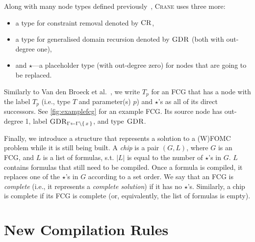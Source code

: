 \documentclass{article}
\theoremstyle{definition}
\DeclareMathOperator{\CR}{\textsc{CR}}
\DeclareMathOperator{\GDR}{\textsc{GDR}}
\begin{document}
%

Along with many node types defined
previously~\cite{DBLP:conf/nips/Broeck11,DBLP:conf/ijcai/BroeckTMDR11},
\textsc{Crane} uses three more:
\begin{itemize}
  \item a type for constraint removal denoted by $\CR$,
  \item a type for generalised domain recursion denoted by $\GDR$ (both with
        out-degree one),
  \item and $\star$---a placeholder type (with out-degree zero) for nodes that
        are going to be replaced.
\end{itemize}
Similarly to Van den Broeck et al.~, we
write $T_p$ for an FCG that has a node with the label $T_p$ (i.e., type $T$ and
parameter(s) $p$) and $\star$'s as all of its direct successors. See
\cref{fig:examplefcg} for an example FCG\@. Its source node has out-degree 1,
label $\GDR_{\Gamma \gets \Gamma \setminus \{\, x \,\}}$, and type $\GDR$.

Finally, we introduce a structure that represents a solution to a (W)FOMC
problem while it is still being built. A \emph{chip} is a pair $(G, L)$, where
$G$ is an FCG, and $L$ is a list of formulas, s.t. $|L|$ is equal to the number
of $\star$'s in $G$. $L$ contains formulas that still need to be compiled. Once
a formula is compiled, it replaces one of the $\star$'s in $G$ according to a
set order. We say that an FCG is \emph{complete} (i.e., it represents a
\emph{complete solution}) if it has no $\star$'s. Similarly, a chip is complete
if its FCG is complete (or, equivalently, the list of formulas is empty).

\section{New Compilation Rules}\label{sec:rules}
\end{document}
